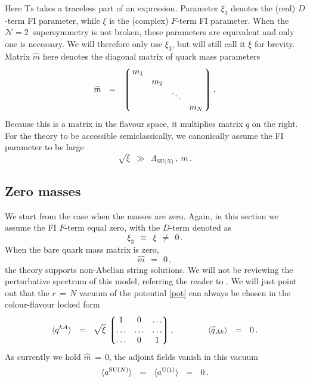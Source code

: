 \documentclass[12pt]{article}
\def\beq{\begin{equation}}
\def\eeq{\end{equation}}
\newcommand{\ntwo}{${\mathcal N}=2$}
\newcommand{\wt}{\widetilde}
\newcommand{\lgr}{\left\lgroup}
\newcommand{\rgr}{\right\rgroup}
\newcommand{\LN}{\Lambda_\text{SU($N$)}}
\newcommand{\aU}{a^{\rm U(1)}}
\newcommand{\aN}{a^\text{SU($N$)}}
\newcommand{\qt}{\wt{q}}
\newcommand{\Ts}{\text{Ts}}
\newcommand{\mhat}{\widehat{m}}
\begin{document}
	Here $ \Ts $ takes a traceless part of an expression.
	Parameter $ \xi_3 $ denotes the (real) $ D $-term FI parameter, while $ \xi $ is the (complex) $ F $-term FI parameter.
	When the \ntwo\, supersymmetry is not broken, these parameters are equivalent and only one is necessary.
	We will therefore only use $ \xi_3 $, but will still call it $ \xi $ for brevity.
	Matrix $ \mhat $ here denotes the diagonal matrix of quark mass parameters
\beq
	\mhat    ~~=~~    \lgr\, \begin{matrix}
			          m_1  &       &        &       \\
				       &  m_2  &        &       \\
				       &       & \ddots &       \\
                                       &       &        &  m_N  
			         \end{matrix} \,\rgr
	.
\eeq
	Because this is a matrix in the flavour space, it multiplies matrix $ q $ on the right.
	For the theory to be accessible semiclassically, we canonically assume the FI parameter to be large
\[
	\sqrt{\xi}    ~~\gg~~    \LN\,,~  m \,.
\]


\subsection{Zero masses}
	We start from the case when the masses are zero.
	Again, in this section we assume the FI $ F $-term equal zero, with the $ D $-term denoted as
\[
	\xi_3    ~~\equiv~~    \xi    ~~\neq~~    0\,.
\]
	When the bare quark mass matrix is zero,
\[
	\mhat    ~~=~~    0\,,
\]
	the theory supports non-Abelian string solutions.
	We will not be reviewing the perturbative spectrum of this model, referring the reader to \cite{SYrev}.
	We will just point out that the $ r \,=\, N $ vacuum of the potential \eqref{pot} can always be chosen
	in the colour-flavour locked form
\beq
\label{qvac}
	\langle q^{kA} \rangle    ~~=~~    \sqrt{\xi}\, 
		\lgr \begin{matrix}
		     		   1    &    0     &    \ldots  \\
				\ldots  &  \ldots  &    \ldots  \\
				\ldots  &    0     &       1
		     \end{matrix} \rgr,
	\qquad\qquad
	\langle \qt{}_{Ak} \rangle    ~~=~~    0\,.
\eeq
	As currently we hold $ \mhat \,=\, 0 $, the adjoint fields vanish in this vacuum
\beq
	\langle \aN \rangle    ~~=~~    \langle \aU \rangle    ~~=~~    0\,.
\eeq
\end{document}
